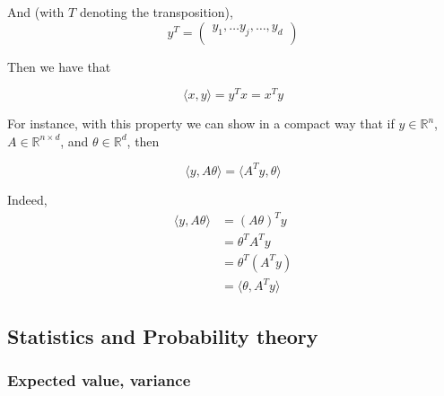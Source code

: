 \documentclass[
10pt, %
a4paper, %
oneside, %
headinclude,footinclude, %
BCOR5mm, %
]{scrartcl}
\begin{document}
And (with $T$ denoting the transposition),
\begin{equation*}
y^T=\begin{pmatrix}
y_{1}, \dots y_j, \dots, y_d\\
\end{pmatrix}
\end{equation*}

Then we have that

\begin{equation*}
    \langle x, y \rangle = y^Tx=x^Ty
\end{equation*}

For instance, with this property we can show in a compact way that if $y\in \mathbb{R}^n$, $A\in \mathbb{R}^{n\times d}$, and $\theta\in \mathbb{R}^d$, then

\begin{equation*}
    \langle y, A\theta\rangle = \langle A^Ty, \theta\rangle
\end{equation*}

Indeed, 
\begin{equation*}
    \begin{aligned}
	\langle y, A\theta\rangle &= (A\theta)^Ty\\
	&= \theta^TA^Ty\\
	&=\theta^T(A^Ty)\\
	&=\langle \theta, A^Ty\rangle
    \end{aligned}
\end{equation*}

\subsection{\large\color{MidnightBlue}Statistics and Probability theory}

\subsubsection{\large\color{Periwinkle}Expected value, variance}
\end{document}
